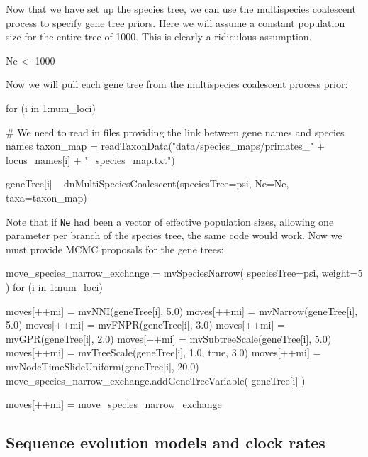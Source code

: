 \documentclass[11pt]{article}
\begin{document}
Now that we have set up the species tree, 
we can use the multispecies coalescent process to specify gene tree priors.
Here we will assume a constant population size for the entire tree
of 1000. This is clearly a ridiculous assumption.
\begin{code}
Ne <- 1000
\end{code}
Now we will pull each gene tree from the multispecies coalescent process prior:
\begin{code}
for (i in 1:num_loci) {

   # We need to read in files providing the link between gene names and species names
   taxon_map = readTaxonData("data/species_maps/primates_" + locus_names[i] + 
                    "_species_map.txt")

   geneTree[i] ~ dnMultiSpeciesCoalescent(speciesTree=psi, Ne=Ne, taxa=taxon_map)
}
\end{code}
Note that if \texttt{Ne} had been a vector of effective population sizes,
allowing one parameter per branch of the species tree, the same code would work.
Now we must provide MCMC proposals for the gene trees:
\begin{code}
move_species_narrow_exchange = mvSpeciesNarrow( speciesTree=psi, weight=5 )
for (i in 1:num_loci) {

   moves[++mi] = mvNNI(geneTree[i], 5.0)
   moves[++mi] = mvNarrow(geneTree[i], 5.0)
   moves[++mi] = mvFNPR(geneTree[i], 3.0)
   moves[++mi] = mvGPR(geneTree[i], 2.0)
   moves[++mi] = mvSubtreeScale(geneTree[i], 5.0)
   moves[++mi] = mvTreeScale(geneTree[i], 1.0, true, 3.0)
   moves[++mi] = mvNodeTimeSlideUniform(geneTree[i], 20.0)
   move_species_narrow_exchange.addGeneTreeVariable( geneTree[i] )

}
moves[++mi] = move_species_narrow_exchange
\end{code}

\subsection{Sequence evolution models and clock rates}
\end{document}
